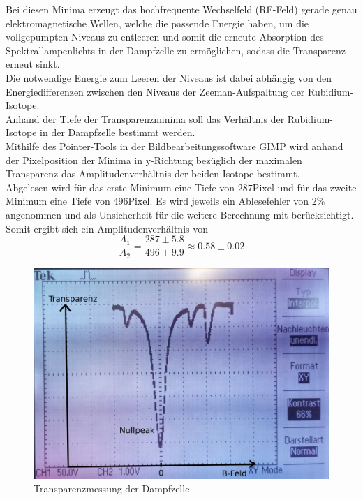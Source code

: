 Bei diesen Minima erzeugt das hochfrequente Wechselfeld (RF-Feld) gerade genau elektromagnetische Wellen, welche die passende Energie haben, um die vollgepumpten Niveaus zu entleeren und somit die erneute Absorption des Spektrallampenlichts in der Dampfzelle zu ermöglichen, sodass die Transparenz erneut sinkt.\\
Die notwendige Energie zum Leeren der Niveaus ist dabei abhängig von den Energiedifferenzen zwischen den Niveaus der Zeeman-Aufspaltung der Rubidium-Isotope.\\
Anhand der Tiefe der Transparenzminima soll das Verhältnis der Rubidium-Isotope in der Dampfzelle bestimmt werden.\\
Mithilfe des Pointer-Tools in der Bildbearbeitungssoftware GIMP \cite{gimp} wird anhand der Pixelposition der Minima in y-Richtung bezüglich der maximalen Transparenz das Amplitudenverhältnis der beiden Isotope bestimmt.\\
Abgelesen wird für das erste Minimum eine Tiefe von $287 \mathrm{Pixel}$ und für das zweite Minimum eine Tiefe von $496 \mathrm{Pixel}$. Es wird jeweils ein Ablesefehler von 2\% angenommen und als Unsicherheit für die weitere Berechnung mit berücksichtigt.\\
Somit ergibt sich ein Amplitudenverhältnis von
\begin{equation*}
  \frac{A_1}{A_2}=\frac{287 \pm5.8}{496 \pm 9.9}\approx 0.58\pm 0.02
\end{equation*}
\begin{figure}
  \centering
  \includegraphics[width=0.9\columnwidth]{pictures/oszilloskop.jpg}
  \caption{Transparenzmessung der Dampfzelle}
  \label{fig:oszi}
\end{figure}

